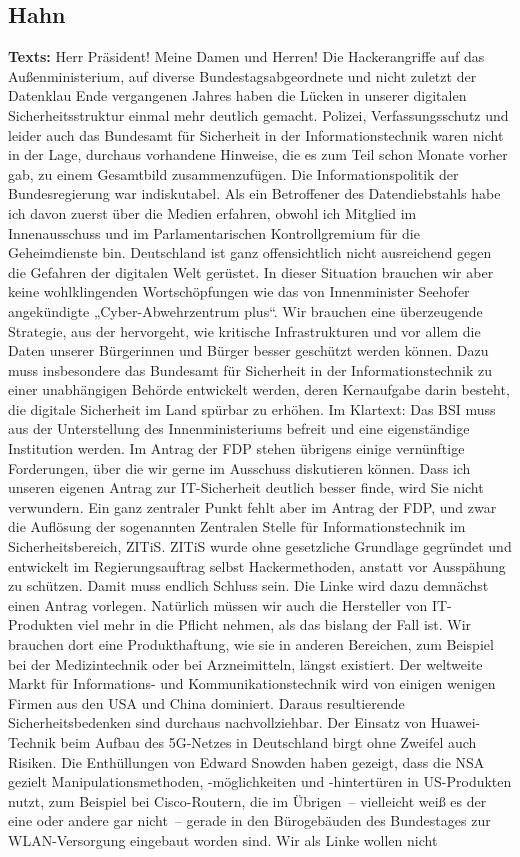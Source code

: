 \documentclass{article}
\begin{document}
\subsection{Hahn}
\noindent\textbf{Texts:} Herr Präsident! Meine Damen und Herren! Die Hackerangriffe auf das Außenministerium, auf diverse Bundestagsabgeordnete und nicht zuletzt der Datenklau Ende vergangenen Jahres haben die Lücken in unserer digitalen Sicherheitsstruktur einmal mehr deutlich gemacht.  Polizei, Verfassungsschutz und leider auch das Bundesamt für Sicherheit in der Informationstechnik waren nicht in der Lage, durchaus vorhandene Hinweise, die es zum Teil schon Monate vorher gab, zu einem Gesamtbild zusammenzufügen. Die Informationspolitik der Bundesregierung war indiskutabel. Als ein Betroffener des Datendiebstahls habe ich davon zuerst über die Medien erfahren, obwohl ich Mitglied im Innenausschuss und im Parlamentarischen Kontrollgremium für die Geheimdienste bin. Deutschland ist ganz offensichtlich nicht ausreichend gegen die Gefahren der digitalen Welt gerüstet. In dieser Situation brauchen wir aber keine wohlklingenden Wortschöpfungen wie das von Innenminister Seehofer angekündigte „Cyber-Abwehrzentrum plus“. Wir brauchen eine überzeugende Strategie, aus der hervorgeht, wie kritische Infrastrukturen und vor allem die Daten unserer Bürgerinnen und Bürger besser geschützt werden können.  Dazu muss insbesondere das Bundesamt für Sicherheit in der Informationstechnik zu einer unabhängigen Behörde entwickelt werden, deren Kernaufgabe darin besteht, die digitale Sicherheit im Land spürbar zu erhöhen. Im Klartext: Das BSI muss aus der Unterstellung des Innenministeriums befreit und eine eigenständige Institution werden.  Im Antrag der FDP stehen übrigens einige vernünftige Forderungen, über die wir gerne im Ausschuss diskutieren können. Dass ich unseren eigenen Antrag zur IT-Sicherheit deutlich besser finde, wird Sie nicht verwundern.  Ein ganz zentraler Punkt fehlt aber im Antrag der FDP, und zwar die Auflösung der sogenannten Zentralen Stelle für Informationstechnik im Sicherheitsbereich, ZITiS. ZITiS wurde ohne gesetzliche Grundlage gegründet und entwickelt im Regierungsauftrag selbst Hackermethoden, anstatt vor Ausspähung zu schützen. Damit muss endlich Schluss sein.  Die Linke wird dazu demnächst einen Antrag vorlegen. Natürlich müssen wir auch die Hersteller von IT-Produkten viel mehr in die Pflicht nehmen, als das bislang der Fall ist. Wir brauchen dort eine Produkthaftung, wie sie in anderen Bereichen, zum Beispiel bei der Medizintechnik oder bei Arzneimitteln, längst existiert. Der weltweite Markt für Informations- und Kommunikationstechnik wird von einigen wenigen Firmen aus den USA und China dominiert. Daraus resultierende Sicherheitsbedenken sind durchaus nachvollziehbar. Der Einsatz von Huawei-Technik beim Aufbau des 5G-Netzes in Deutschland birgt ohne Zweifel auch Risiken. Die Enthüllungen von Edward Snowden haben gezeigt, dass die NSA gezielt Manipulationsmethoden, -möglichkeiten und -hintertüren in US-Produkten nutzt, zum Beispiel bei Cisco-Routern, die im Übrigen – vielleicht weiß es der eine oder andere gar nicht – gerade in den Bürogebäuden des Bundestages zur WLAN-Versorgung eingebaut worden sind. Wir als Linke wollen nicht 
\end{document}
